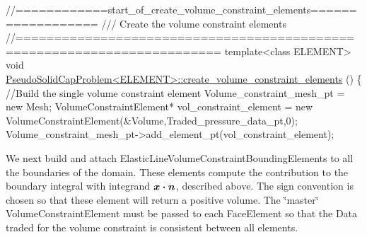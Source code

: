 \begin{DoxyCodeInclude}
\textcolor{comment}{//============start\_of\_create\_volume\_constraint\_elements==================}
\textcolor{comment}{/// Create the volume constraint elements}
\textcolor{comment}{}\textcolor{comment}{//========================================================================}
\textcolor{keyword}{template}<\textcolor{keyword}{class} ELEMENT>
\textcolor{keywordtype}{void} \hyperlink{classPseudoSolidCapProblem_a0289801610e2bc864c67d4d8557d56b1}{PseudoSolidCapProblem<ELEMENT>::create\_volume\_constraint\_elements}
      ()
\{
 \textcolor{comment}{//Build the single volume constraint element}
 Volume\_constraint\_mesh\_pt = \textcolor{keyword}{new} Mesh;
 VolumeConstraintElement* vol\_constraint\_element = 
  \textcolor{keyword}{new} VolumeConstraintElement(&Volume,Traded\_pressure\_data\_pt,0);
 Volume\_constraint\_mesh\_pt->add\_element\_pt(vol\_constraint\_element);

\end{DoxyCodeInclude}


We next build and attach {\ttfamily Elastic\+Line\+Volume\+Constraint\+Bounding\+Elements} to all the boundaries of the domain. These elements compute the contribution to the boundary integral with integrand $ \mbox{\boldmath$x\cdot n$} $, described above. The sign convention is chosen so that these element will return a positive volume. The \char`\"{}master\char`\"{} {\ttfamily Volume\+Constraint\+Element} must be passed to each {\ttfamily Face\+Element} so that the {\ttfamily Data} traded for the volume constraint is consistent between all elements.


